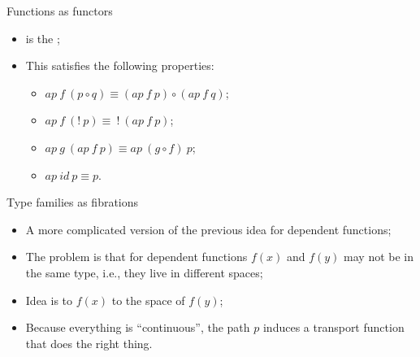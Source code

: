 \documentclass[11pt]{beamer}
\newcommand{\red}[1]{{\color{red}{#1}}}
\newcommand{\blue}[1]{{\color{blue}{#1}}}
\begin{document}
\begin{frame}{Functions as functors}

\begin{itemize}
\vfill\item \blue{$\mathit{ap}~f~p$} is the \red{action of $f$ on a path $p$};
\vfill\item This satisfies the following properties:
  \begin{itemize}
  \vfill\item $\mathit{ap}~f~(p \circ q) \equiv 
                (\mathit{ap}~f~p) \circ (\mathit{ap}~f~q)$;
  \vfill\item $\mathit{ap}~f~(!~p) \equiv ~!~(\mathit{ap}~f~p)$;
  \vfill\item $\mathit{ap}~g~(\mathit{ap}~f~p) \equiv 
                \mathit{ap}~(g \circ f)~p$;
  \vfill\item $\mathit{ap}~\mathit{id}~p \equiv p$.
  \end{itemize}
\end{itemize}
\vfill
\end{frame}

\begin{frame}{Type families as fibrations}
\vfill
\begin{itemize}

\vfill\item A more complicated version of the previous idea for dependent
functions;

\vfill\item The problem is that for dependent functions $f(x)$ and $f(y)$ may
not be in the same type, i.e., they live in different spaces;

\vfill\item Idea is to \red{transport} $f(x)$ to the space of $f(y)$;

\vfill\item Because everything is ``continuous'', the path $p$ induces a
transport function that does the right thing.
\end{itemize}
\vfill
\end{frame}
\end{document}
